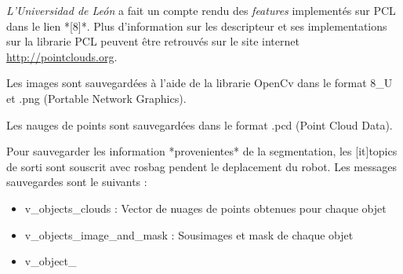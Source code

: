 \textit{L'Universidad de León } a fait un compte rendu des
\textit{features} implementés sur PCL dans le lien *[8]*. Plus
d'information sur les descripteur et ses implementations sur la
librarie PCL peuvent être retrouvés sur le site
internet \url{http://pointclouds.org}.

Les images sont sauvegardées à l'aide de la librarie OpenCv dans le format 8\_U et .png (Portable Network Graphics).

Les nauges de points sont sauvegardées dans le format .pcd (Point Cloud Data).

Pour sauvegarder les information *provenientes* de la segmentation, les [it]topics de sorti sont souscrit avec rosbag pendent le deplacement du robot. Les messages sauvegardes sont le suivants :

\begin{itemize}
\item v\_objects\_clouds : Vector de nuages de points obtenues pour chaque objet 

\item v\_objects\_image\_and\_mask : Sousimages et mask de chaque objet

\item v\_object\_

\end{itemize}


